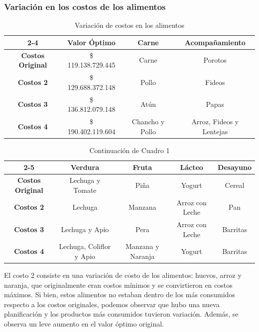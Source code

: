 \documentclass[letterpaper]{article}
\begin{document}
    \subsubsection{Variación en los costos de los alimentos}
\begin{table}[H]
\centering
\begin{tabular}{c|c|c|c|}
\cline{2-4}
 & \textbf{Valor Óptimo} & \textbf{Carne} & \textbf{Acompañamiento} \\ \hline
\multicolumn{1}{|c|}{\textbf{Costos Original}} & \$ 119.138.729.445 & Carne & Porotos \\ \hline
\multicolumn{1}{|c|}{\textbf{Costos 2}} & \$ 129.688.372.148 & Pollo & Fideos \\ \hline
\multicolumn{1}{|c|}{\textbf{Costos 3}} & \$ 136.812.079.148 & Atún & Papas \\ \hline
\multicolumn{1}{|c|}{\textbf{Costos 4}} & \$ 190.402.119.604 & Chancho y Pollo & Arroz, Fideos y Lentejas \\ \hline
\end{tabular}
\caption{Variación de costos en los alimentos}
\end{table}

\begin{table}[H]
\centering
\begin{tabular}{c|c|c|c|c|}
\cline{2-5}
 & \textbf{Verdura} & \textbf{Fruta} & \textbf{Lácteo} & \textbf{Desayuno} \\ \hline
\multicolumn{1}{|c|}{\textbf{Costos Original}} & Lechuga y Tomate & Piña & Yogurt & Cereal \\ \hline
\multicolumn{1}{|c|}{\textbf{Costos 2}} & Lechuga & Manzana & Arroz con Leche & Pan \\ \hline
\multicolumn{1}{|c|}{\textbf{Costos 3}} & Lechuga y Apio & Pera & Arroz con Leche & Barritas \\ \hline
\multicolumn{1}{|c|}{\textbf{Costos 4}} & Lechuga, Coliflor y Apio & Manzana y Naranja & Yogurt & Barritas \\ \hline
\end{tabular}
\caption{Continuación de Cuadro 1}
\end{table}

El costo 2 consiste en una variación de costo de los alimentos: huevos, arroz y naranja, que originalmente eran costos mínimos y se convirtieron en costos máximos. Si bien, estos alimentos no estaban dentro de los más consumidos respecto a los costos originales, podemos observar que hubo una nueva planificación y los productos más consumidos tuvieron variación. Además, se observa un leve aumento en el valor óptimo original. \\
\end{document}

